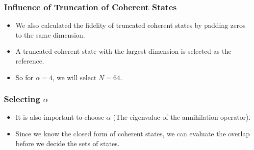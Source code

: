 \documentclass{beamer}
\begin{document}
\begin{frame}
    \frametitle{Influence of Truncation of Coherent States}
    \begin{itemize}
        \item We also calculated the fidelity of truncated
              coherent states by padding zeros to the same dimension.
        \item A truncated coherent state with the largest dimension
              is selected as the reference.
        \item So for $\alpha = 4$, we will select $N = 64$.
    \end{itemize}
    \begin{table}[ht]
        \centering
        \caption{Fidelity of $\ket{\alpha}$ w.r.t N = 1024 ($\alpha = 4$)}
        \label{tab:fock-fidelity}
    \end{table}
\end{frame}

\begin{frame}
    \frametitle{Selecting $\alpha$}
    \begin{itemize}
        \item It is also important to choose $\alpha$ (The eigenvalue of the
              annihilation operator).
        \item Since we know the closed form of coherent states, we can evaluate
              the overlap before we decide the sets of states.
    \end{itemize}
\end{frame}
\end{document}
